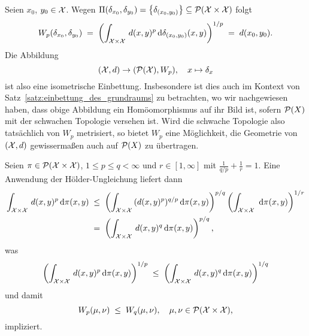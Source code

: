 \documentclass[../thesis/thesis.tex]{subfiles}
\begin{document}
	\begin{Bemerkung}
		Seien $x_0$, $y_0 \in \mathcal{X}$. Wegen $\Pi(\delta_{x_0}, \delta_{y_0}) = \left\{\delta_{(x_0, y_0)}\right\} \subseteq \mathcal{P}(\mathcal{X} \times \mathcal{X})$ folgt
		\[ W_p(\delta_{x_0}, \delta_{y_0}) \; = \; \left( \int_{\mathcal{X} \times \mathcal{X}} \, d(x, y)^p \, \mathrm{d}\delta_{(x_0, y_0)}(x, y) \right)^{1/p} \; = \; d(x_0, y_0) \text{.} \]
		Die Abbildung 
		\[ (\mathcal{X}, d) \to (\mathcal{P}(\mathcal{X}), W_p), \quad x \mapsto \delta_x \]
		ist also eine isometrische Einbettung. Insbesondere ist dies auch im Kontext von Satz~\ref{satz:einbettung_des_grundraums} zu betrachten, wo wir nachgewiesen haben, dass obige Abbildung ein Homöomorphismus auf 
		ihr Bild ist, sofern $\mathcal{P}(X)$ mit der schwachen Topologie versehen ist. Wird die schwache Topologie also tatsächlich von $W_p$ metrisiert, so bietet $W_p$ eine Möglichkeit, die Geometrie von $(\mathcal{X}, d)$ gewissermaßen auch auf $\mathcal{P}(X)$ zu übertragen.
	\end{Bemerkung}

	\begin{Bemerkung}
		Seien $\pi \in \mathcal{P}(\mathcal{X} \times \mathcal{X})$, $1 \leq p \leq q < \infty$ und $r \in [1, \infty]$ mit $\frac{1}{q/p} + \frac{1}{r} = 1$. Eine Anwendung der Hölder-Ungleichung liefert dann
		\begin{align*}
			\int_{\mathcal{X} \times \mathcal{X}} \, d(x, y)^p \, \mathrm{d}\pi(x, y) \; &\leq \; \left( \int_{\mathcal{X} \times \mathcal{X}} \, (d(x, y)^p)^{q/p} \, \mathrm{d}\pi(x, y) \right)^{p/q} \left( \int_{\mathcal{X} \times \mathcal{X}} \,  \, \mathrm{d}\pi(x, y) \right)^{1/r} \\
			                                                    &=    \; \left( \int_{\mathcal{X} \times \mathcal{X}} \, d(x, y)^q \, \mathrm{d}\pi(x, y) \right)^{p/q} \text{,}
		\end{align*}
		was
		\[ \left( \int_{\mathcal{X} \times \mathcal{X}} \, d(x, y)^p \, \mathrm{d}\pi(x, y) \right)^{1/p} \; \leq \; \left( \int_{\mathcal{X} \times \mathcal{X}} \, d(x, y)^q \, \mathrm{d}\pi(x, y) \right)^{1/q} \]
		und damit
		\[ W_p(\mu, \nu) \; \leq \; W_q(\mu, \nu), \quad \mu, \nu \in \mathcal{P}(\mathcal{X} \times \mathcal{X}) \text{,} \]
		impliziert.
	\end{Bemerkung}
\end{document}
